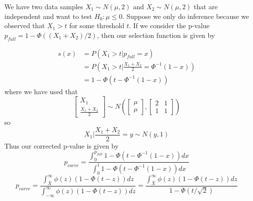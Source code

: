 \documentclass{article}
\begin{document}
\begin{appendix}
We have two data samples $X_1 \sim N(\mu, 2)$ and $X_2 \sim N(\mu, 2)$ that are independent and want to test $H_0 : \mu \leq 0$. Suppose we only do inference because we observed that $X_1  > t$ for some threshold $t$. If we consider the p-value $p_{full} = 1 - \Phi((X_1 + X_2)/2  )$, then our selection function is given by 

\begin{align*}
    s(x) &= P( X_1 > t | p_{full} = x ) \\
         &=  P( X_1 > t | \frac{X_1 + X_2}{2} =  \Phi^{-1}(1 -x) )\\
         &= 1 - \Phi(t - \Phi^{-1}(1 - x))
\end{align*}
where we have used that 
\begin{equation*}
    \begin{bmatrix}
    X_1 \\ \frac{X_1 + X_2}{2}
    \end{bmatrix} \sim N \left(\begin{bmatrix}
        \mu \\ \mu
        \end{bmatrix}, \begin{bmatrix}
            2  & 1 \\ 1 & 1
            \end{bmatrix} \right)
\end{equation*}
so 
\begin{equation*}
    X_1 | \frac{X_1 + X_2}{2} = y \sim N(y, 1)
\end{equation*}
Thus our corrected p-value is given by 
\begin{equation*}
    p_{carve} = \frac{\int_0^{p_{full}}  1 - \Phi(t - \Phi^{-1}(1-x) )   dx }{\int_0^1 1 - \Phi(t - \Phi^{-1}(1-x) ) dx}
\end{equation*}
\begin{equation*}
    p_{carve} = \frac{\int_{\bar{X}}^{\infty} \phi(z) (1 - \Phi(t - z))   dz }{\int_{-\infty}^{\infty} \phi(z) (1 - \Phi(t - z))  dz } = \frac{\int_{\bar{X}}^{\infty} \phi(z) (1 - \Phi(t - z))   dz }{1 - \Phi(t/\sqrt{2})   }
\end{equation*}


\end{appendix}
\end{document}
